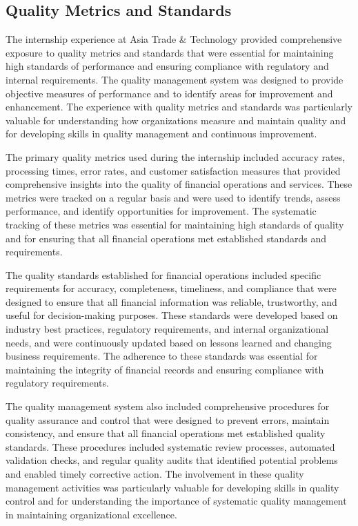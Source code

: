 \subsection{Quality Metrics and Standards}
The internship experience at Asia Trade \& Technology provided comprehensive exposure to quality metrics and standards that were essential for maintaining high standards of performance and ensuring compliance with regulatory and internal requirements. The quality management system was designed to provide objective measures of performance and to identify areas for improvement and enhancement. The experience with quality metrics and standards was particularly valuable for understanding how organizations measure and maintain quality and for developing skills in quality management and continuous improvement.

The primary quality metrics used during the internship included accuracy rates, processing times, error rates, and customer satisfaction measures that provided comprehensive insights into the quality of financial operations and services. These metrics were tracked on a regular basis and were used to identify trends, assess performance, and identify opportunities for improvement. The systematic tracking of these metrics was essential for maintaining high standards of quality and for ensuring that all financial operations met established standards and requirements.

The quality standards established for financial operations included specific requirements for accuracy, completeness, timeliness, and compliance that were designed to ensure that all financial information was reliable, trustworthy, and useful for decision-making purposes. These standards were developed based on industry best practices, regulatory requirements, and internal organizational needs, and were continuously updated based on lessons learned and changing business requirements. The adherence to these standards was essential for maintaining the integrity of financial records and ensuring compliance with regulatory requirements.

The quality management system also included comprehensive procedures for quality assurance and control that were designed to prevent errors, maintain consistency, and ensure that all financial operations met established quality standards. These procedures included systematic review processes, automated validation checks, and regular quality audits that identified potential problems and enabled timely corrective action. The involvement in these quality management activities was particularly valuable for developing skills in quality control and for understanding the importance of systematic quality management in maintaining organizational excellence.

